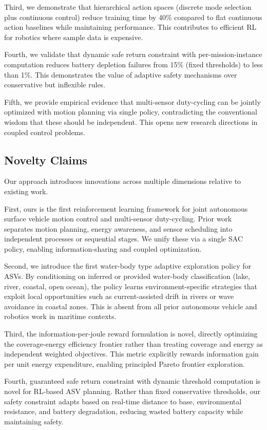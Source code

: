 Third, we demonstrate that hierarchical action spaces (discrete mode selection plus continuous control) reduce training time by 40\% compared to flat continuous action baselines while maintaining performance. This contributes to efficient RL for robotics where sample data is expensive.

Fourth, we validate that dynamic safe return constraint with per-mission-instance computation reduces battery depletion failures from 15\% (fixed thresholds) to less than 1\%. This demonstrates the value of adaptive safety mechanisms over conservative but inflexible rules.

Fifth, we provide empirical evidence that multi-sensor duty-cycling can be jointly optimized with motion planning via single policy, contradicting the conventional wisdom that these should be independent. This opens new research directions in coupled control problems.

\subsection{Novelty Claims}

Our approach introduces innovations across multiple dimensions relative to existing work.

First, ours is the first reinforcement learning framework for joint autonomous surface vehicle motion control and multi-sensor duty-cycling. Prior work separates motion planning, energy awareness, and sensor scheduling into independent processes or sequential stages. We unify these via a single SAC policy, enabling information-sharing and coupled optimization.

Second, we introduce the first water-body type adaptive exploration policy for ASVs. By conditioning on inferred or provided water-body classification (lake, river, coastal, open ocean), the policy learns environment-specific strategies that exploit local opportunities such as current-assisted drift in rivers or wave avoidance in coastal zones. This is absent from all prior autonomous vehicle and robotics work in maritime contexts.

Third, the information-per-joule reward formulation is novel, directly optimizing the coverage-energy efficiency frontier rather than treating coverage and energy as independent weighted objectives. This metric explicitly rewards information gain per unit energy expenditure, enabling principled Pareto frontier exploration.

Fourth, guaranteed safe return constraint with dynamic threshold computation is novel for RL-based ASV planning. Rather than fixed conservative thresholds, our safety constraint adapts based on real-time distance to base, environmental resistance, and battery degradation, reducing wasted battery capacity while maintaining safety.

